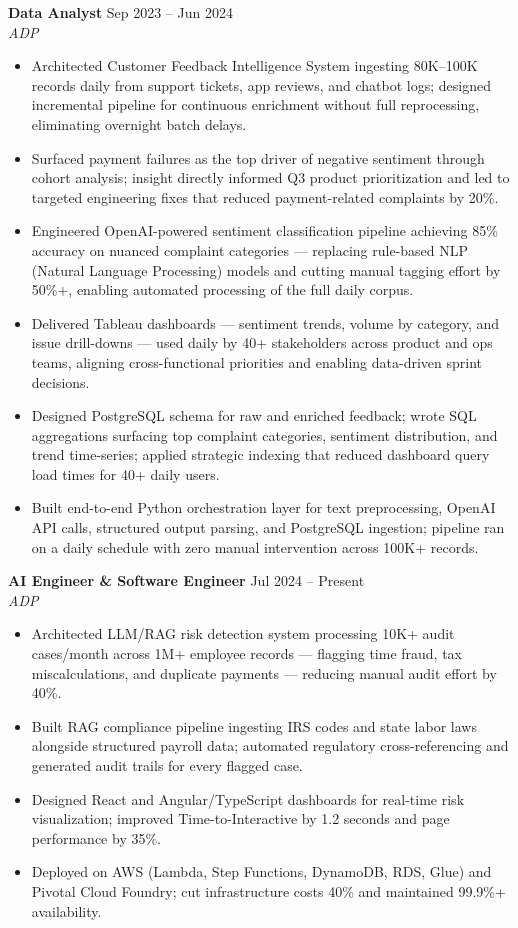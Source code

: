 \documentclass[10pt,letterpaper]{article}
\newcommand{\entry}[3]{%
  \vspace{3pt}\textbf{#1} \hfill #3 \\
  \textit{\small #2}\vspace{1pt}}
\begin{document}
\entry{Data Analyst}{ADP}{Sep 2023 -- Jun 2024}
\begin{itemize}
  \item Architected Customer Feedback Intelligence System ingesting 80K--100K records daily from support tickets, app reviews, and chatbot logs; designed incremental pipeline for continuous enrichment without full reprocessing, eliminating overnight batch delays.
  \item Surfaced payment failures as the top driver of negative sentiment through cohort analysis; insight directly informed Q3 product prioritization and led to targeted engineering fixes that reduced payment-related complaints by 20\%.
  \item Engineered OpenAI-powered sentiment classification pipeline achieving 85\% accuracy on nuanced complaint categories --- replacing rule-based NLP (Natural Language Processing) models and cutting manual tagging effort by 50\%+, enabling automated processing of the full daily corpus.
  \item Delivered Tableau dashboards --- sentiment trends, volume by category, and issue drill-downs --- used daily by 40+ stakeholders across product and ops teams, aligning cross-functional priorities and enabling data-driven sprint decisions.
  \item Designed PostgreSQL schema for raw and enriched feedback; wrote SQL aggregations surfacing top complaint categories, sentiment distribution, and trend time-series; applied strategic indexing that reduced dashboard query load times for 40+ daily users.
  \item Built end-to-end Python orchestration layer for text preprocessing, OpenAI API calls, structured output parsing, and PostgreSQL ingestion; pipeline ran on a daily schedule with zero manual intervention across 100K+ records.
\end{itemize}

\entry{AI Engineer \& Software Engineer}{ADP}{Jul 2024 -- Present}
\begin{itemize}
  \item Architected LLM/RAG risk detection system processing 10K+ audit cases/month across 1M+ employee records --- flagging time fraud, tax miscalculations, and duplicate payments --- reducing manual audit effort by 40\%.
  \item Built RAG compliance pipeline ingesting IRS codes and state labor laws alongside structured payroll data; automated regulatory cross-referencing and generated audit trails for every flagged case.
  \item Designed React and Angular/TypeScript dashboards for real-time risk visualization; improved Time-to-Interactive by 1.2 seconds and page performance by 35\%.
  \item Deployed on AWS (Lambda, Step Functions, DynamoDB, RDS, Glue) and Pivotal Cloud Foundry; cut infrastructure costs 40\% and maintained 99.9\%+ availability.
\end{itemize}
\end{document}
